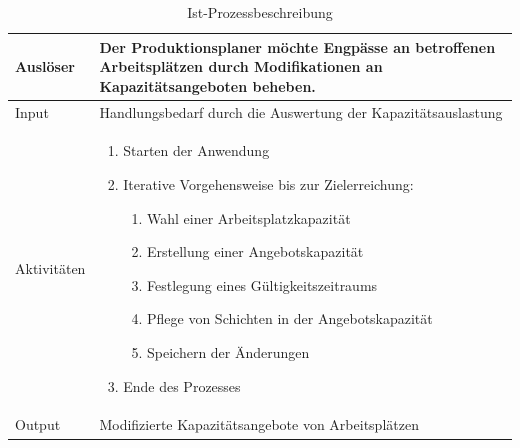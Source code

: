 \begin{table}[H]
	\centering
	\begin{tabularx}{\textwidth}{|l|X|} 
		\hline
		Auslöser                                     &   
		Der Produktionsplaner möchte Engpässe an betroffenen Arbeitsplätzen durch Modifikationen an Kapazitätsangeboten beheben. \\ 
		\hline\hline
		Input                                         &   
		Handlungsbedarf durch die Auswertung der Kapazitätsauslastung \\ 
		\hline\hline
		Aktivitäten &   
		\begin{minipage}{5in}
    		\begin{enumerate} 
        		\renewcommand{\labelenumi}{(\arabic{enumi})}
        		\item Starten der Anwendung
        		\item Iterative Vorgehensweise bis zur Zielerreichung:
            		\begin{enumerate} 
            		\renewcommand{\labelenumi}{(\arabic{enumi})}
            		\item Wahl einer Arbeitsplatzkapazität
            		\item Erstellung einer Angebotskapazität
            		\item Festlegung eines Gültigkeitszeitraums
            		\item Pflege von Schichten in der Angebotskapazität
            		\item Speichern der Änderungen
            		\end{enumerate}
            	\item Ende des Prozesses
    		\end{enumerate}
    		\vspace{1pt}		
		\end{minipage} \\
		\hline\hline
		Output                                        &   
		Modifizierte Kapazitätsangebote von Arbeitsplätzen  \\
		\hline
	\end{tabularx}
	\caption{\label{tab:aktivitäten}Ist-Prozessbeschreibung }
\end{table}


